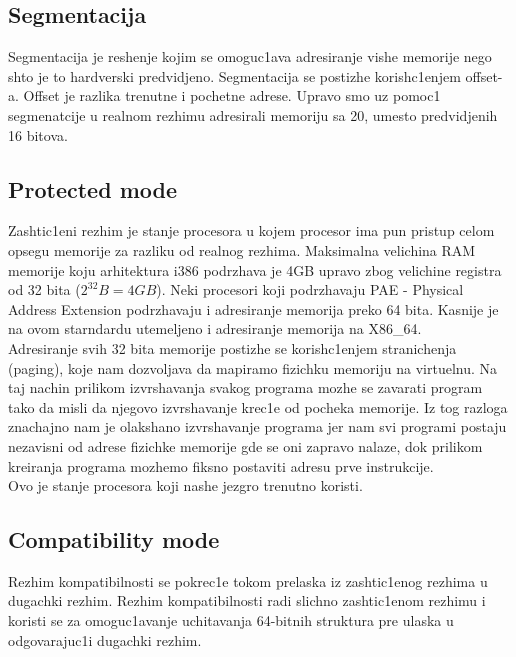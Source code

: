 \documentclass[a4paper,fleqn,12pt]{JMThesis}
\newcommand\eng{\fontencoding{OT1}\fontfamily{\rmdefault}\selectfont}
\begin{document}
\subsection{Segmentacija}
\smallskip

Segmentacija je reshenje kojim se omoguc1ava adresiranje vishe memorije nego
shto je to hardverski predvidjeno. Segmentacija se postizhe korish\/c1enjem
{\eng offset}-a. {\eng Offset} je razlika trenutne i pochetne adrese. Upravo
smo uz pomoc1 segmenatcije u realnom rezhimu adresirali memoriju sa 20, umesto
predvidjenih 16 bitova.

\subsection{{\eng Protected mode}}
\smallskip

Zashtic1eni rezhim je stanje procesora u kojem procesor ima pun pristup celom
opsegu memorije za razliku od realnog rezhima. Maksimalna velichina {\eng RAM}
memorije koju arhitektura {\eng i386} podrzhava je {\eng 4GB} upravo zbog
velichine registra od 32 bita ($2^{32}B = 4GB$). Neki procesori koji
podrzhavaju {\eng PAE - Physical Address Extension} podrzhavaju i adresiranje
memorija preko 64 bita. Kasnije je na ovom starndardu utemeljeno i adresiranje
memorija na {\eng X86\_64}.\\

Adresiranje svih 32 bita memorije postizhe se korish\/c1enjem stranichenja
({\eng paging}), koje nam dozvoljava da mapiramo fizichku memoriju na
virtuelnu. Na taj nachin prilikom izvrshavanja svakog programa mozhe se
zavarati program tako da misli da njegovo izvrshavanje krec1e od pocheka
memorije. Iz tog razloga znachajno nam je olakshano izvrshavanje programa jer
nam svi programi postaju nezavisni od adrese fizichke memorije gde se oni
zapravo nalaze, dok prilikom kreiranja programa mozhemo fiksno postaviti adresu
prve instrukcije.\\

Ovo je stanje procesora koji nashe jezgro trenutno koristi.

\subsection{{\eng Compatibility mode}}
\smallskip

Rezhim kompatibilnosti se pokrec1e tokom prelaska iz zashtic1enog rezhima u
dugachki rezhim. Rezhim kompatibilnosti radi slichno zashtic1enom rezhimu i
koristi se za omoguc1avanje uchitavanja 64-bitnih struktura pre ulaska u
odgovarajuc1i dugachki rezhim.
\end{document}
